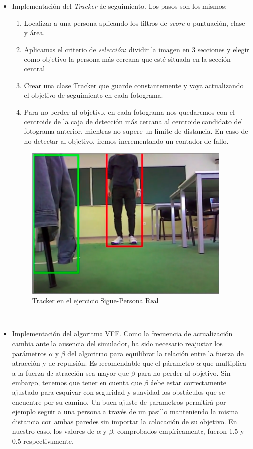 \begin{itemize}
	\item Implementación del \textit{Tracker} de seguimiento. Los pasos son los mismos:
	\begin{enumerate}
		\item Localizar a una persona aplicando los filtros de \textit{score} o puntuación, clase y área.
		\item Aplicamos el criterio de \textit{selección}: dividir la imagen en 3 secciones y elegir como objetivo la persona más cercana que esté situada en la sección central
		\item Crear una clase Tracker que guarde constantemente y vaya actualizando el objetivo de seguimiento en cada fotograma.
		\item Para no perder al objetivo, en cada fotograma nos quedaremos con el centroide de la caja de detección más cercana al centroide candidato del fotograma anterior, mientras no supere un límite de distancia. En caso de no detectar al objetivo, iremos incrementando un contador de fallo.
	\end{enumerate}
	\begin{figure} [H]
		\begin{center}
			\includegraphics[width=10cm]{imagenes/cap6/tracker.png}
		\end{center}
		\caption[Tracker en el ejercicio Sigue-Persona Real]{Tracker en el ejercicio Sigue-Persona Real}
		\label{fig:tracker_real_follow_person}
	\end{figure}\
	
	\item Implementación del algoritmo VFF. Como la frecuencia de actualización cambia ante la ausencia del simulador, ha sido necesario reajustar los parámetros $\alpha$ y $\beta$ del algoritmo para equilibrar la relación entre la fuerza de atracción y de repulsión. Es recomendable que el párametro $\alpha$ que multiplica a la fuerza de atracción sea mayor que $\beta$ para no perder al objetivo. Sin embargo, tenemos que tener en cuenta que $\beta$ debe estar correctamente ajustado para esquivar con seguridad y suavidad los obstáculos que se encuentre por su camino. Un buen ajuste de parametros permitirá por ejemplo seguir a una persona a través de un pasillo manteniendo la misma distancia con ambas paredes sin importar la colocación de su objetivo. En nuestro caso, los valores de $\alpha$ y $\beta$, comprobados empíricamente, fueron 1.5 y 0.5 respectivamente.
	

\end{itemize}
